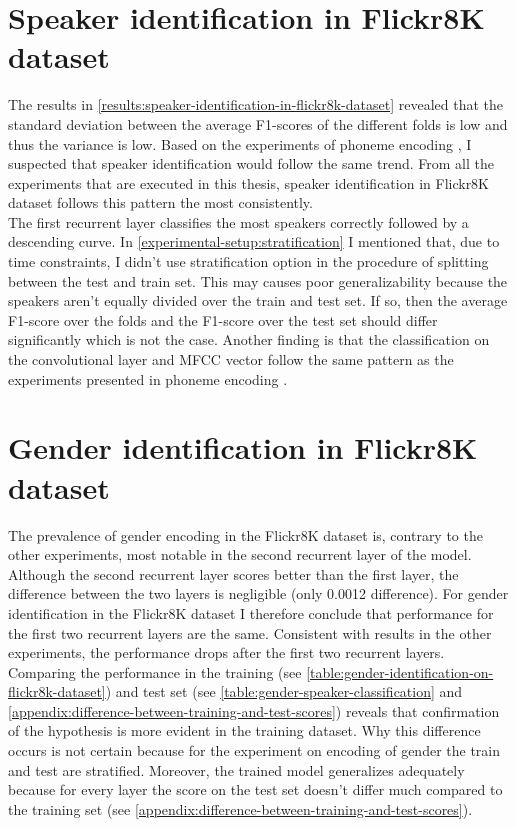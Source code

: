 \documentclass[a4paper, oneside]{book}
\begin{document}
\section{Speaker identification in Flickr8K dataset}\label{discussion:speaker-identification-in-flickr8k-dataset}

The results in \autoref{results:speaker-identification-in-flickr8k-dataset} revealed that the standard deviation between the average F1-scores of the different folds is low and thus the variance is low. Based on the experiments of phoneme encoding \cite{AlishahiBC17}, I suspected that speaker identification would follow the same trend. From all the experiments that are executed in this thesis, speaker identification in Flickr8K dataset follows this pattern the most consistently. \\ 

The first recurrent layer classifies the most speakers correctly followed by a descending curve. In \autoref{experimental-setup:stratification} I mentioned that, due to time constraints, I didn’t use stratification option in the procedure of splitting between the test and train set. This may causes poor generalizability because the speakers aren’t equally divided over the train and test set. If so, then the average F1-score over the folds and the F1-score over the test set should differ significantly which is not the case. Another finding is that the classification on the convolutional layer and MFCC vector follow the same pattern as the experiments presented in phoneme encoding \cite{AlishahiBC17}.

\section{Gender identification in Flickr8K dataset}\label{discussion:gender-identification-in-flickr8k-dataset}

The prevalence of gender encoding in the Flickr8K dataset is, contrary to the other experiments, most notable in the second recurrent layer of the model. Although the second recurrent layer scores better than the first layer, the difference between the two layers is negligible (only 0.0012 difference). For gender identification in the Flickr8K dataset I therefore conclude that performance for the first two recurrent layers are the same. Consistent with results in the other experiments, the performance drops after the first two recurrent layers. Comparing the performance in the training (see \autoref{table:gender-identification-on-flickr8k-dataset}) and test set (see \autoref{table:gender-speaker-classification} and \autoref{appendix:difference-between-training-and-test-scores}) reveals that confirmation of the hypothesis is more evident in the training dataset. Why this difference occurs is not certain because for the experiment on encoding of gender the train and test are stratified. Moreover, the trained model generalizes adequately because for every layer the score on the test set doesn't differ much compared to the training set (see \autoref{appendix:difference-between-training-and-test-scores}).
\end{document}
